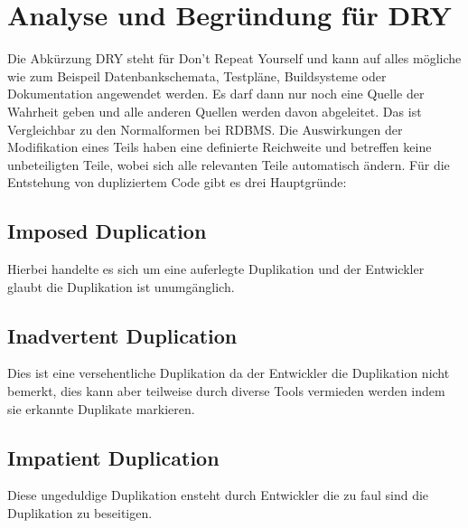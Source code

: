 \section{Analyse und Begründung für DRY}
Die Abkürzung DRY steht für Don’t Repeat Yourself und kann auf alles mögliche wie zum Beispeil Datenbankschemata, Testpläne, Buildsysteme oder Dokumentation angewendet werden.
Es darf dann nur noch eine Quelle der Wahrheit geben und alle anderen Quellen werden davon abgeleitet.
Das ist Vergleichbar zu den Normalformen bei RDBMS.
Die Auswirkungen der Modifikation eines Teils haben eine definierte Reichweite und betreffen keine unbeteiligten Teile,
wobei sich alle relevanten Teile automatisch ändern.
Für die Entstehung von dupliziertem Code gibt es drei Hauptgründe:
\subsection{Imposed Duplication}
Hierbei handelte es sich um eine auferlegte Duplikation und der Entwickler glaubt die Duplikation ist unumgänglich.
\subsection{Inadvertent Duplication}
Dies ist eine versehentliche Duplikation da der Entwickler die Duplikation nicht bemerkt,
dies kann aber teilweise durch diverse Tools vermieden werden indem sie erkannte Duplikate markieren.
\subsection{Impatient Duplication}
Diese ungeduldige Duplikation ensteht durch Entwickler die zu faul sind die Duplikation zu beseitigen.
